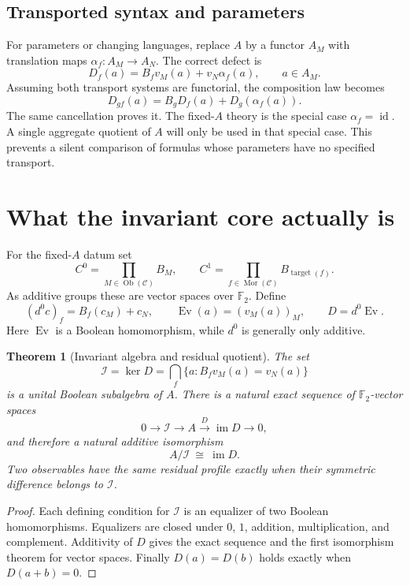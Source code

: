 \documentclass[11pt,letterpaper]{article}
\newtheorem{theorem}{Theorem}[section]
\theoremstyle{definition}
\newcommand{\F}{\mathbb F_2}
\newcommand{\im}{\operatorname{im}}
\newcommand{\id}{\operatorname{id}}
\newcommand{\Ev}{\operatorname{Ev}}
\newcommand{\Inv}{\mathcal I}
\newcommand{\Ob}{\operatorname{Ob}}
\newcommand{\Mor}{\operatorname{Mor}}
\begin{document}
\subsection{Transported syntax and parameters}
For parameters or changing languages, replace $A$ by a functor $A_M$ with translation maps $\alpha_f:A_M\to A_N$. The correct defect is
\begin{equation}\label{eq:typeddefect}
D_f(a)=B_fv_M(a)+v_N\alpha_f(a),\qquad a\in A_M.
\end{equation}
Assuming both transport systems are functorial, the composition law becomes
\[
D_{gf}(a)=B_gD_f(a)+D_g(\alpha_f(a)).
\]
The same cancellation proves it. The fixed-$A$ theory is the special case $\alpha_f=\id$. A single aggregate quotient of $A$ will only be used in that special case. This prevents a silent comparison of formulas whose parameters have no specified transport.

\section{What the invariant core actually is}\label{sec:core}
For the fixed-$A$ datum set
\[
C^0=\prod_{M\in\Ob(\mathcal C)}B_M,\qquad
C^1=\prod_{f\in\Mor(\mathcal C)}B_{\operatorname{target}(f)}.
\]
As additive groups these are vector spaces over $\F$. Define
\[
(d^0c)_f=B_f(c_M)+c_N,\qquad
\Ev(a)=(v_M(a))_M,\qquad D=d^0\Ev.
\]
Here $\Ev$ is a Boolean homomorphism, while $d^0$ is generally only additive.

\begin{theorem}[Invariant algebra and residual quotient]\label{thm:exactsequence}
The set
\[
\Inv=\ker D=\bigcap_f\{a:B_fv_M(a)=v_N(a)\}
\]
is a unital Boolean subalgebra of $A$. There is a natural exact sequence of $\F$-vector spaces
\begin{equation}\label{eq:exactsequence}
0\longrightarrow\Inv\longrightarrow A\xrightarrow{D}\im D\longrightarrow0,
\end{equation}
and therefore a natural additive isomorphism
\[
A/\Inv\ \cong\ \im D.
\]
Two observables have the same residual profile exactly when their symmetric difference belongs to $\Inv$.
\end{theorem}
\begin{proof}
Each defining condition for $\Inv$ is an equalizer of two Boolean homomorphisms. Equalizers are closed under $0$, $1$, addition, multiplication, and complement. Additivity of $D$ gives the exact sequence and the first isomorphism theorem for vector spaces. Finally $D(a)=D(b)$ holds exactly when $D(a+b)=0$.
\end{proof}
\end{document}
